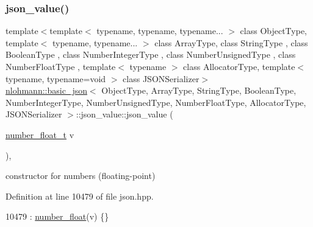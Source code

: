 \subsubsection{\texorpdfstring{json\+\_\+value()}{json\_value()}\hspace{0.1cm}{\footnotesize\ttfamily [5/12]}}
{\footnotesize\ttfamily template$<$template$<$ typename, typename, typename... $>$ class Object\+Type, template$<$ typename, typename... $>$ class Array\+Type, class String\+Type , class Boolean\+Type , class Number\+Integer\+Type , class Number\+Unsigned\+Type , class Number\+Float\+Type , template$<$ typename $>$ class Allocator\+Type, template$<$ typename, typename=void $>$ class J\+S\+O\+N\+Serializer$>$ \\
\hyperlink{classnlohmann_1_1basic__json}{nlohmann\+::basic\+\_\+json}$<$ Object\+Type, Array\+Type, String\+Type, Boolean\+Type, Number\+Integer\+Type, Number\+Unsigned\+Type, Number\+Float\+Type, Allocator\+Type, J\+S\+O\+N\+Serializer $>$\+::json\+\_\+value\+::json\+\_\+value (\begin{DoxyParamCaption}\item[{\hyperlink{classnlohmann_1_1basic__json_a88d6103cb3620410b35200ee8e313d97}{number\+\_\+float\+\_\+t}}]{v }\end{DoxyParamCaption})\hspace{0.3cm}{\ttfamily [inline]}, {\ttfamily [noexcept]}}



constructor for numbers (floating-\/point) 



Definition at line 10479 of file json.\+hpp.


\begin{DoxyCode}
10479 : \hyperlink{unionnlohmann_1_1basic__json_1_1json__value_ad003495e39e78b8096e0b6fc690d146f}{number\_float}(v) \{\}
\end{DoxyCode}
\mbox{\label{unionnlohmann_1_1basic__json_1_1json__value_a34114e47b2d6391ba97678cefef700c4}} 
